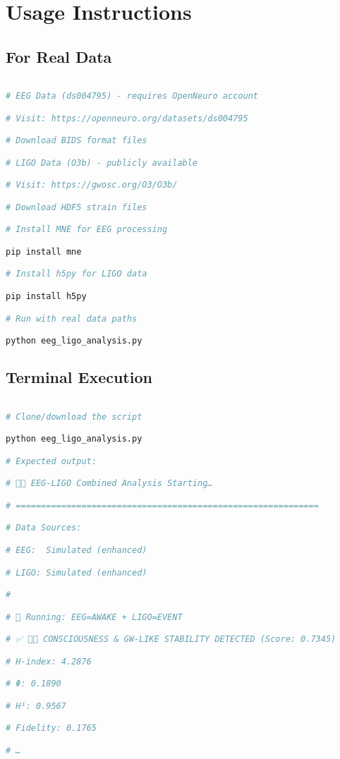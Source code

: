 \documentclass[11pt]{article}
\begin{document}
\section{Usage Instructions}

\subsection{For Real Data}

\begin{lstlisting}[language=bash, caption={Download and setup real datasets}]

# EEG Data (ds004795) - requires OpenNeuro account

# Visit: https://openneuro.org/datasets/ds004795

# Download BIDS format files

# LIGO Data (O3b) - publicly available

# Visit: https://gwosc.org/O3/O3b/

# Download HDF5 strain files

# Install MNE for EEG processing

pip install mne

# Install h5py for LIGO data

pip install h5py

# Run with real data paths

python eeg_ligo_analysis.py
\end{lstlisting}

\subsection{Terminal Execution}

\begin{lstlisting}[language=bash, caption={Simple terminal execution}]

# Clone/download the script

python eeg_ligo_analysis.py

# Expected output:

# 🧠🌌 EEG-LIGO Combined Analysis Starting…

# ============================================================

# Data Sources:

# EEG:  Simulated (enhanced)

# LIGO: Simulated (enhanced)

# 

# 🔄 Running: EEG=AWAKE + LIGO=EVENT

# ✅ 🧠🌌 CONSCIOUSNESS & GW-LIKE STABILITY DETECTED (Score: 0.7345)

# H-index: 4.2876

# Φ: 0.1890

# H¹: 0.9567

# Fidelity: 0.1765

# …

\end{lstlisting}
\end{document}
